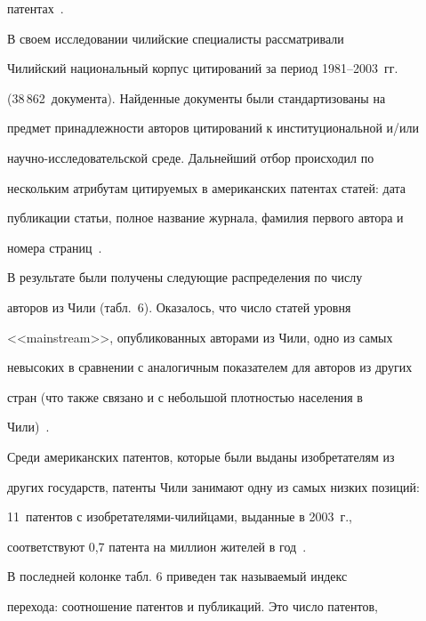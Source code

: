 патентах~\cite{17-koz}. 


     


     В своем исследовании чилийские специалисты рассматривали 


Чилийский национальный корпус цитирований за период 1981--2003~гг.\ 


(38\,862~документа). Найденные документы были стандартизованы на 


предмет принадлежности авторов цитирований к институциональной и/или 


научно-исследовательской среде. Дальнейший отбор происходил по 


нескольким атрибутам цитируемых в американских патентах статей: дата 


публикации статьи, полное название журнала, фамилия первого автора и 


номера страниц~\cite{17-koz}.


     


     В результате были получены следующие распределения по числу 


авторов из Чили (табл.~6). Оказалось, что число статей уровня 


<<mainstream>>, опубликованных авторами из Чили, одно из самых 


невысоких в сравнении с аналогичным показателем для авторов из других 


стран (что также связано и с небольшой плотностью населения в 


Чили)~\cite{17-koz}.








      


     Среди американских патентов, которые были выданы изобретателям из 


других государств, патенты Чили занимают одну из самых низких позиций: 


11~патентов с изобретателями-чилийцами, выданные в 2003~г., 


соответствуют 0,7 патента на миллион жителей в год~\cite{17-koz}.


     


     В последней колонке табл. 6 приведен так называемый индекс 


перехода: соотношение патентов и публикаций. Это число патентов, 


